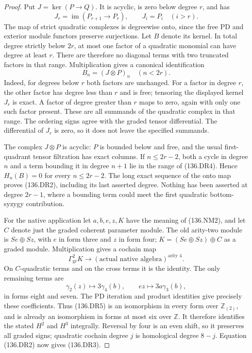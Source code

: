 \begin{proof}
Put \(J=\ker(P\to Q)\). It is acyclic, is zero below
degree \(r\), and has
\[
        J_r=\operatorname{im}(P_{r+1}\to P_r),
                       \qquad J_i=P_i\quad(i>r).
\]
The map of strict quadratic complexes is degreewise onto,
since the free PD and exterior module functors preserve
surjections. Let \(B\) denote its kernel.
In total degree strictly below \(2r\), at most one factor
of a quadratic monomial can have degree at least \(r\).
There are therefore no diagonal terms with two truncated
factors in that range. Multiplication gives a canonical
identification
\[
                       B_n=(J\otimes P)_n\quad(n<2r).
                                                               \tag{136.DR4}
\]
Indeed, for degrees below \(r\) both factors are unchanged.
For a factor in degree \(r\), the other factor has degree
less than \(r\) and is free; tensoring the displayed kernel
\(J_r\) is exact. A factor of degree greater than \(r\)
maps to zero, again with only one such factor present.
These are all summands of the quadratic complex in that
range. The ordering signs agree with the graded tensor
differential. The differential of \(J_r\) is zero, so it
does not leave the specified summands.

The complex \(J\otimes P\) is acyclic: \(P\) is bounded
below and free, and the usual first-quadrant tensor filtration
has exact columns. If \(n\leq2r-2\), both a cycle in degree
\(n\) and a term bounding it in degree \(n+1\) lie in the
range of (136.DR4). Hence \(H_n(B)=0\) for every
\(n\leq2r-2\). The long exact sequence of the onto map
proves (136.DR2), including its last asserted degree. Nothing
has been asserted at degree \(2r-1\), where a bounding term
could meet the first quadratic bottom-syzygy contribution.

For the native application let \(a,b,e,z,K\) have the meaning
of (136.NM2), and let \(C\) denote just the graded coherent
parameter module. The old arity-two module is
\(Se\oplus Sz\), with \(e\) in form three and \(z\)
in form four; \(K=(Se\oplus Sz)\oplus C\) as a graded
module. Multiplication gives a cochain map
\[
 \Gamma^2_{\mathrm{gr}}K
            \longrightarrow (\text{actual native algebra})^{\text{arity }4}.
                                                               \tag{136.DR5}
\]
On \(C\)-quadratic terms and on the cross terms it is the
identity. The only remaining terms are
\[
 \gamma_2(z)\longmapsto3\gamma_4(b),\qquad
 ez\longmapsto3a\gamma_3(b),                            \tag{136.DR6}
\]
in forms eight and seven. The PD iteration and product
identities give precisely these coefficients. Thus (136.DR5)
is an isomorphism in every form over \(\mathbb Z_{(2)}\),
and is already an isomorphism in forms at most six over
\(\mathbb Z\). It therefore identifies the stated \(H^2\)
and \(H^3\) integrally. Reversal by four is an even shift,
so it preserves all graded signs; quadratic cochain degree
\(j\) is homological degree \(8-j\). Equation (136.DR2)
now gives (136.DR3).


\end{proof}
